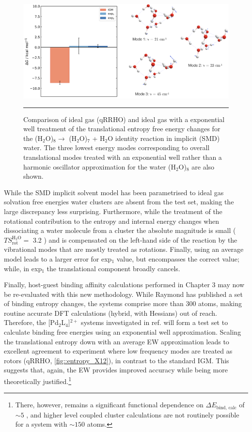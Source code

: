 \documentclass[../main.tex]{subfiles}
\begin{document}
\vspace{0.4cm}
\begin{figure}[h!]
	\centering
	\includegraphics[width=15cm]{4/figs/figX11/figX11}
	\vspace{0.2cm}
	\hrule
	\caption{Comparison of ideal gas (qRRHO) and ideal gas with a exponential well treatment of the translational entropy free energy changes for the (H$_2$O)$_8 \longrightarrow$ (H$_2$O)$_7$ +  H$_2$O identity reaction in implicit (SMD) water. The three lowest energy modes corresponding to overall translational modes treated with an exponential well rather than a harmonic oscillator approximation for the water (H$_2$O)$_8$ are also shown.} 
	\label{fig::entropy_X11}
\end{figure}

While the SMD implicit solvent model has been parametrised to ideal gas solvation free energies water clusters are absent from the test set,\cite{Marenich2009} making the large discrepancy less surprising. Furthermore, while the treatment of the rotational contribution to the entropy and internal energy changes when dissociating a water molecule from a cluster the absolute magnitude is small ($TS_\text{rot}^{\text{H}{}_2\text{O}} =$ 3.2 \kcal) and is compensated on the left-hand side of the reaction by the vibrational modes that are mostly treated as rotations. Finally, using an average model leads to a larger error for exp$_1$ value, but encompasses the correct value; while, in exp$_1$ the translational component broadly cancels.


\newpage
Finally, host-guest binding affinity calculations performed in Chapter 3 may now be re-evaluated with this new methodology.  While Raymond has published a set of binding entropy changes,\cite{Leung2008} the systems comprise more than 300 atoms, making routine accurate DFT calculations (hybrid, with Hessians) out of reach. Therefore, the [Pd$_2$L$_4$]${}^{2+}$ systems investigated in ref. \cite{Young2019} will form a test set to calculate binding free energies using an exponential well approximation. Scaling the translational entropy down with an average EW approximation leads to excellent agreement to experiment where low frequency modes are treated as rotors (qRRHO, \figurename{ \ref{fig::entropy_X12}}), in contrast to the standard IGM. This suggests that, again, the EW provides improved accuracy while being more theoretically justified.\footnote{There, however, remains a significant functional dependence on $\Delta E_\text{bind, calc}$ of $\sim 5$ \kcal, and higher level coupled cluster calculations are not routinely possible for a system with $\sim 150$ atoms.}
\end{document}
